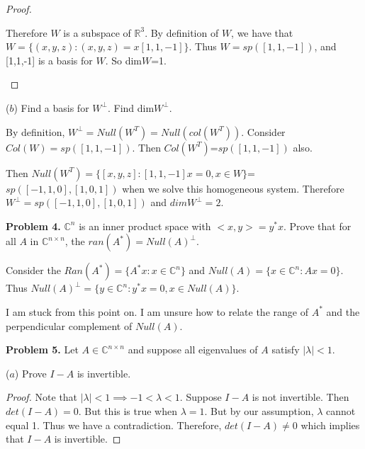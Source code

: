 \documentclass[12pt]{article}
\begin{document}
\begin{proof}
\begin{flushleft} Therefore $W$ is a subspace of $\mathbb{R}^{3}$. By definition of $W$, we have that 
$W=\{ (x,y,z) : (x,y,z) = x[1,1, -1]\}$. Thus $W=sp([1,1,-1])$, and [1,1,-1] is a basis for $W$. So dim$W$=1. 
\end{flushleft}
\end{proof}

\vspace{.2cm}

\begin{flushleft} 
($b$) Find a basis for $W^{\perp}$. Find dim$W^{\perp}$. 

\vspace{.2cm}

By definition, $W^{\perp}=Null(W^{T})=Null(col(W^{T}))$. Consider $Col(W)=sp([1,1,-1])$. Then $Col(W^{T})$=$sp([1,1,-1])$ also. 

Then $Null(W^{T})=\{[x,y,z] : [1,1,-1]x=0, x \in W\}$=$sp([-1,1,0], [1,0,1])$ when we solve this homogeneous system. Therefore $W^{\perp}=sp([-1,1,0], [1,0,1])$ and $dimW^{\perp}=2$. \end{flushleft}

\vspace{.2cm}

\begin{flushleft} \textbf{Problem 4.} $\mathbb{C}^{n}$ is an inner product space with $<x,y>=y^{*}x$. Prove that for all $A$ in $\mathbb{C}^{n \times n}$, the $ran(A^{*})=Null(A)^{\perp}$. \end{flushleft}

\begin{flushleft} Consider the $Ran(A^{*})=\{A^{*}x : x \in \mathbb{C}^{n}\}$ and $Null(A)=\{x \in \mathbb{C}^{n} : Ax=0\}$. Thus $Null(A)^{\perp}=\{y \in \mathbb{C}^{n} : y^{*}x=0, x \in Null(A)\}$. \end{flushleft}

\color{red} I am stuck from this point on. I am unsure how to relate the range of $A^{*}$ and the perpendicular complement of $Null(A)$. 

\color{black} \begin{flushleft} \textbf{Problem 5.} Let $A \in \mathbb{C}^{n \times n}$ and suppose all eigenvalues of $A$ satisfy $|\lambda| < 1$. 

\vspace{.2cm} 

($a$) Prove $I-A$ is invertible. 
\begin{proof} Note that $|\lambda|<1 \implies -1<\lambda<1$. Suppose $I-A$ is not invertible. Then $det(I-A)=0$. But this is true when $\lambda =1$. But by our assumption, $\lambda$ cannot equal 1. Thus we have a contradiction. Therefore, $det(I-A) \neq 0$ which implies that $I-A$ is invertible. \end{proof}\end{flushleft}
\end{document}

